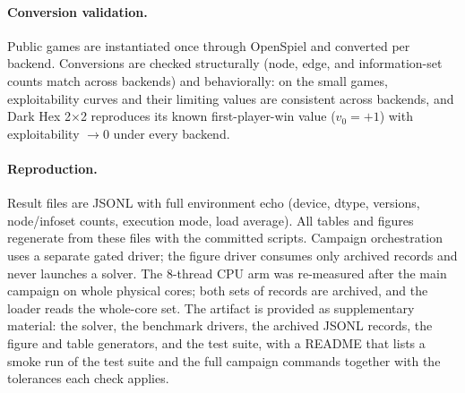 \paragraph{Conversion validation.}
Public games are instantiated once through OpenSpiel and converted per backend.
Conversions are checked structurally (node, edge, and information-set counts match
across backends) and behaviorally: on the small games, exploitability curves and
their limiting values are consistent across backends, and Dark Hex 2$\times$2
reproduces its known first-player-win value ($v_0 = +1$) with exploitability
$\to 0$ under every backend.

\paragraph{Reproduction.}
Result files are JSONL with full environment echo (device, dtype, versions,
node/infoset counts, execution mode, load average). All tables and figures regenerate
from these files with the committed scripts. Campaign orchestration uses a separate
gated driver; the figure driver consumes only archived records and never launches a
solver. The 8-thread CPU arm was re-measured after the main campaign on whole physical
cores; both sets of records are archived, and the loader reads
the whole-core set. The artifact is provided as supplementary material: the solver,
the benchmark drivers, the archived JSONL records, the figure and table generators,
and the test suite, with a README that lists a smoke run of the test suite and the
full campaign commands together with the tolerances each check applies.
